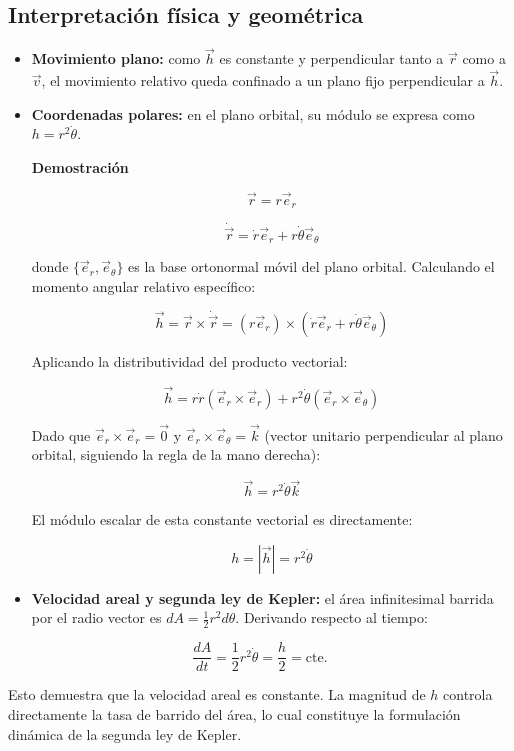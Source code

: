 \subsection{Interpretación física y geométrica}
\begin{itemize}
    \item \textbf{Movimiento plano:} como \(\vec{h}\) es constante y perpendicular tanto a \(\vec{r}\) como a \(\vec{v}\), el movimiento relativo queda confinado a un plano fijo perpendicular a \(\vec{h}\).
    \item \textbf{Coordenadas polares:} en el plano orbital, su módulo se expresa como \(h = r^2\dot{\theta}\).
    
    \textbf{Demostración}
    
    $$\vec{r} = r \vec{e}_r$$

$$\dot{\vec{r}} = \dot{r} \vec{e}_r + r\dot{\theta} \vec{e}_\theta$$

donde $\{\vec{e}_r, \vec{e}_\theta\}$ es la base ortonormal móvil del plano orbital. Calculando el momento angular relativo específico:

$$\vec{h} = \vec{r} \times \dot{\vec{r}} = (r \vec{e}_r) \times (\dot{r} \vec{e}_r + r\dot{\theta} \vec{e}_\theta)$$

Aplicando la distributividad del producto vectorial:

$$\vec{h} = r\dot{r}(\vec{e}_r \times \vec{e}_r) + r^2\dot{\theta}(\vec{e}_r \times \vec{e}_\theta)$$

Dado que $\vec{e}_r \times \vec{e}_r = \vec{0}$ y $\vec{e}_r \times \vec{e}_\theta = \vec{k}$ (vector unitario perpendicular al plano orbital, siguiendo la regla de la mano derecha):

$$\vec{h} = r^2\dot{\theta} \vec{k}$$

El módulo escalar de esta constante vectorial es directamente:

$$h = |\vec{h}| = r^2\dot{\theta}$$

    \item \textbf{Velocidad areal y segunda ley de Kepler:} el área infinitesimal barrida por el radio vector es \(dA = \frac{1}{2}r^2 d\theta\). Derivando respecto al tiempo:
\end{itemize}

\[
\frac{dA}{dt} = \frac{1}{2}r^2\dot{\theta} = \frac{h}{2} = \text{cte.}
\]

Esto demuestra que la velocidad areal es constante. La magnitud de \(h\) controla directamente la tasa de barrido del área, lo cual constituye la formulación dinámica de la segunda ley de Kepler.


